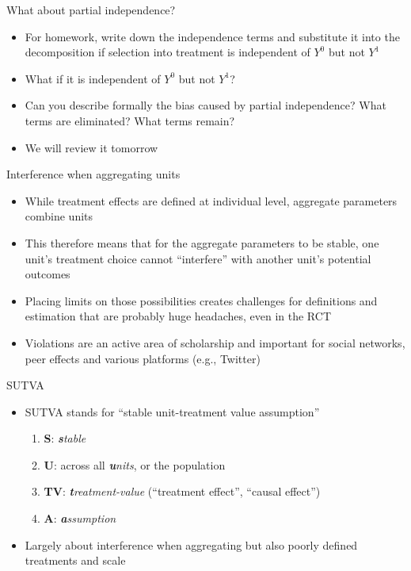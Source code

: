 \documentclass{beamer}
\begin{document}
\begin{frame}{What about partial independence?}

  \begin{itemize}
  \item For homework, write down the independence terms and substitute it into the decomposition if selection into treatment is independent of $Y^0$ but not $Y^1$
  \item What if it is independent of $Y^0$ but not $Y^1$?
  \item Can you describe formally the bias caused by partial independence?  What terms are eliminated?  What terms remain?
  \item We will review it tomorrow
  \end{itemize}
\end{frame}




\begin{frame}{Interference when aggregating units}

\begin{itemize}
\item While treatment effects are defined at individual level, aggregate parameters combine units
\item This therefore means that for the aggregate parameters to be stable, one unit's treatment choice cannot ``interfere'' with another unit's potential outcomes
\item Placing limits on those possibilities creates challenges for definitions and estimation that are probably huge headaches, even in the RCT
\item Violations are an active area of scholarship and important for social networks, peer effects and various platforms (e.g., Twitter)
\end{itemize}

\end{frame}

\begin{frame}{SUTVA}

  \begin{itemize}
    \item SUTVA stands for ``stable unit-treatment value assumption''
          \begin{enumerate}
            \item \textbf{S}: \emph{\textbf{s}table}
            \item \textbf{U}: across all \emph{\textbf{u}nits}, or the population
            \item \textbf{TV}: \emph{\textbf{t}reatment-value} (``treatment effect'', ``causal effect'')
            \item \textbf{A}: \emph{\textbf{a}ssumption}
          \end{enumerate}
    \item Largely about interference when aggregating but also poorly defined treatments and scale
  \end{itemize}
\end{frame}
\end{document}

